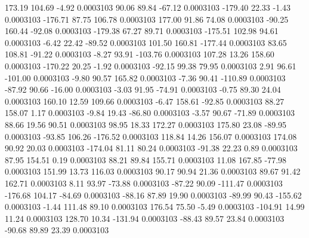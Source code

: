       173.19      104.69       -4.92     0.0003103
       90.06       89.84      -67.12     0.0003103
     -179.40       22.33       -1.43     0.0003103
     -176.71       87.75      106.78     0.0003103
      177.00       91.86       74.08     0.0003103
      -90.25      160.44      -92.08     0.0003103
     -179.38       67.27       89.71     0.0003103
     -175.51      102.98       94.61     0.0003103
       -6.42       22.42      -89.52     0.0003103
      101.50      160.81     -177.44     0.0003103
       83.65      108.81      -91.22     0.0003103
       -8.27       93.91     -103.76     0.0003103
      107.28       13.26      158.60     0.0003103
     -170.22       20.25       -1.92     0.0003103
      -92.15       99.38       79.95     0.0003103
        2.91       96.61     -101.00     0.0003103
       -9.80       90.57      165.82     0.0003103
       -7.36       90.41     -110.89     0.0003103
      -87.92       90.66      -16.00     0.0003103
       -3.03       91.95      -74.91     0.0003103
       -0.75       89.30       24.04     0.0003103
      160.10       12.59      109.66     0.0003103
       -6.47      158.61      -92.85     0.0003103
       88.27      158.07        1.17     0.0003103
       -9.84       19.43      -86.80     0.0003103
       -3.57       90.67      -71.89     0.0003103
       88.66       19.56       90.51     0.0003103
       98.95       18.33      172.27     0.0003103
      175.80       23.08      -89.95     0.0003103
      -93.85      106.26     -176.52     0.0003103
      118.84       14.26      156.07     0.0003103
      174.08       90.92       20.03     0.0003103
     -174.04       81.11       80.24     0.0003103
      -91.38       22.23        0.89     0.0003103
       87.95      154.51        0.19     0.0003103
       88.21       89.84      155.71     0.0003103
       11.08      167.85      -77.98     0.0003103
      151.99       13.73      116.03     0.0003103
       90.17       90.94       21.36     0.0003103
       89.67       91.42      162.71     0.0003103
        8.11       93.97      -73.88     0.0003103
      -87.22       90.09     -111.47     0.0003103
     -176.68      104.17      -84.69     0.0003103
      -88.16       87.89       19.90     0.0003103
      -89.99       90.43     -155.62     0.0003103
       -1.44      111.48       89.10     0.0003103
      176.54       75.50       -5.49     0.0003103
     -104.91       14.99       11.24     0.0003103
      128.70       10.34     -131.94     0.0003103
      -88.43       89.57       23.84     0.0003103
      -90.68       89.89       23.39     0.0003103
